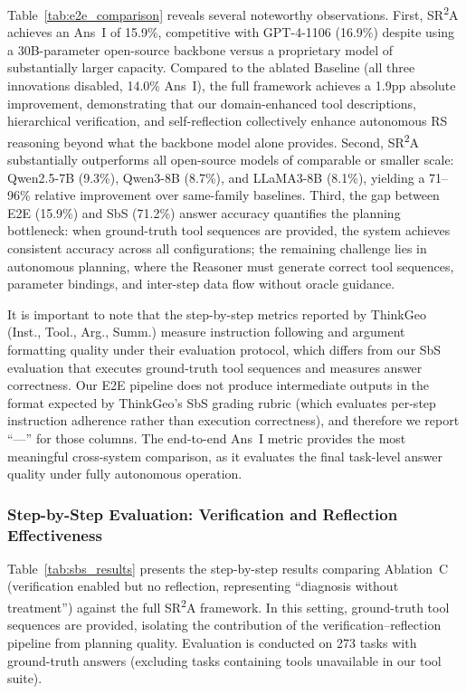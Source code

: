 \documentclass[journal]{IEEEtran}
\begin{document}
Table~\ref{tab:e2e_comparison} reveals several noteworthy observations.
First, SR\textsuperscript{2}A achieves an Ans~I of 15.9\%, competitive with GPT-4-1106 (16.9\%) despite using a 30B-parameter open-source backbone versus a proprietary model of substantially larger capacity.
Compared to the ablated Baseline (all three innovations disabled, 14.0\% Ans~I), the full framework achieves a 1.9pp absolute improvement, demonstrating that our domain-enhanced tool descriptions, hierarchical verification, and self-reflection collectively enhance autonomous RS reasoning beyond what the backbone model alone provides.
Second, SR\textsuperscript{2}A substantially outperforms all open-source models of comparable or smaller scale: Qwen2.5-7B (9.3\%), Qwen3-8B (8.7\%), and LLaMA3-8B (8.1\%), yielding a 71--96\% relative improvement over same-family baselines.
Third, the gap between E2E (15.9\%) and SbS (71.2\%) answer accuracy quantifies the planning bottleneck: when ground-truth tool sequences are provided, the system achieves consistent accuracy across all configurations; the remaining challenge lies in autonomous planning, where the Reasoner must generate correct tool sequences, parameter bindings, and inter-step data flow without oracle guidance.

It is important to note that the step-by-step metrics reported by ThinkGeo (Inst., Tool., Arg., Summ.) measure instruction following and argument formatting quality under their evaluation protocol, which differs from our SbS evaluation that executes ground-truth tool sequences and measures answer correctness.
Our E2E pipeline does not produce intermediate outputs in the format expected by ThinkGeo's SbS grading rubric (which evaluates per-step instruction adherence rather than execution correctness), and therefore we report ``---'' for those columns.
The end-to-end Ans~I metric provides the most meaningful cross-system comparison, as it evaluates the final task-level answer quality under fully autonomous operation.


\subsubsection{Step-by-Step Evaluation: Verification and Reflection Effectiveness}

Table~\ref{tab:sbs_results} presents the step-by-step results comparing Ablation~C (verification enabled but no reflection, representing ``diagnosis without treatment'') against the full SR\textsuperscript{2}A framework.
In this setting, ground-truth tool sequences are provided, isolating the contribution of the verification--reflection pipeline from planning quality.
Evaluation is conducted on 273 tasks with ground-truth answers (excluding tasks containing tools unavailable in our tool suite).
\end{document}
